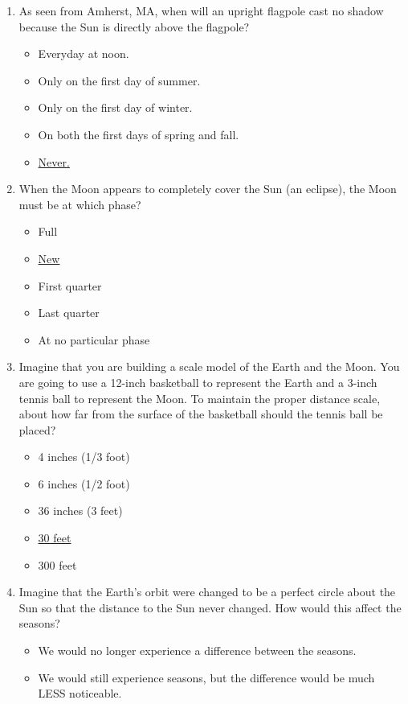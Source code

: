 \documentclass[12pt]{article}
\begin{document}
\begin{enumerate}
\item
As seen from Amherst, MA, when will an upright flagpole cast no shadow because the Sun is directly above the flagpole?
\begin{itemize}
    \item Everyday at noon.
    \item Only on the first day of summer.
    \item Only on the first day of winter.
    \item On both the first days of spring and fall.
    \item \underline{Never.}
\end{itemize}
\item
When the Moon appears to completely cover the Sun (an eclipse), the Moon must be at which phase?
\begin{itemize}
    \item Full
    \item \underline{New}
    \item First quarter
    \item Last quarter
    \item At no particular phase
\end{itemize}
\item
Imagine that you are building a scale model of the Earth and the Moon. You are going to use a 12-inch basketball to represent the Earth and a 3-inch tennis ball to represent the Moon. To maintain the proper distance scale, about how far from the surface of the basketball should the tennis ball be placed?
\begin{itemize}
    \item 4 inches (1/3 foot)
    \item 6 inches (1/2 foot)
    \item 36 inches (3 feet)
    \item \underline{30 feet}
    \item 300 feet
\end{itemize}
\item
Imagine that the Earth's orbit were changed to be a perfect circle about the Sun so that the distance to the Sun never changed. How would this affect the seasons?
\begin{itemize}
    \item We would no longer experience a difference between the seasons.
    \item We would still experience seasons, but the difference would be much LESS noticeable.

\end{itemize}
\end{enumerate}
\end{document}
